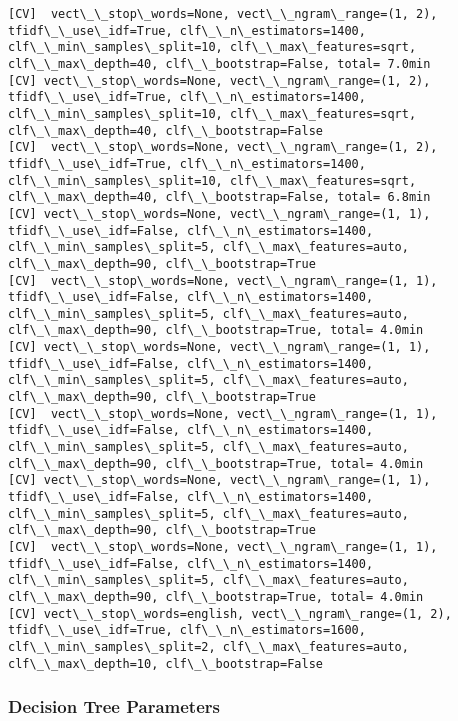 \documentclass[11pt]{article}
\begin{document}
\begin{Verbatim}[commandchars=\\\{\}]
[CV]  vect\_\_stop\_words=None, vect\_\_ngram\_range=(1, 2), tfidf\_\_use\_idf=True, clf\_\_n\_estimators=1400, clf\_\_min\_samples\_split=10, clf\_\_max\_features=sqrt, clf\_\_max\_depth=40, clf\_\_bootstrap=False, total= 7.0min
[CV] vect\_\_stop\_words=None, vect\_\_ngram\_range=(1, 2), tfidf\_\_use\_idf=True, clf\_\_n\_estimators=1400, clf\_\_min\_samples\_split=10, clf\_\_max\_features=sqrt, clf\_\_max\_depth=40, clf\_\_bootstrap=False 
[CV]  vect\_\_stop\_words=None, vect\_\_ngram\_range=(1, 2), tfidf\_\_use\_idf=True, clf\_\_n\_estimators=1400, clf\_\_min\_samples\_split=10, clf\_\_max\_features=sqrt, clf\_\_max\_depth=40, clf\_\_bootstrap=False, total= 6.8min
[CV] vect\_\_stop\_words=None, vect\_\_ngram\_range=(1, 1), tfidf\_\_use\_idf=False, clf\_\_n\_estimators=1400, clf\_\_min\_samples\_split=5, clf\_\_max\_features=auto, clf\_\_max\_depth=90, clf\_\_bootstrap=True 
[CV]  vect\_\_stop\_words=None, vect\_\_ngram\_range=(1, 1), tfidf\_\_use\_idf=False, clf\_\_n\_estimators=1400, clf\_\_min\_samples\_split=5, clf\_\_max\_features=auto, clf\_\_max\_depth=90, clf\_\_bootstrap=True, total= 4.0min
[CV] vect\_\_stop\_words=None, vect\_\_ngram\_range=(1, 1), tfidf\_\_use\_idf=False, clf\_\_n\_estimators=1400, clf\_\_min\_samples\_split=5, clf\_\_max\_features=auto, clf\_\_max\_depth=90, clf\_\_bootstrap=True 
[CV]  vect\_\_stop\_words=None, vect\_\_ngram\_range=(1, 1), tfidf\_\_use\_idf=False, clf\_\_n\_estimators=1400, clf\_\_min\_samples\_split=5, clf\_\_max\_features=auto, clf\_\_max\_depth=90, clf\_\_bootstrap=True, total= 4.0min
[CV] vect\_\_stop\_words=None, vect\_\_ngram\_range=(1, 1), tfidf\_\_use\_idf=False, clf\_\_n\_estimators=1400, clf\_\_min\_samples\_split=5, clf\_\_max\_features=auto, clf\_\_max\_depth=90, clf\_\_bootstrap=True 
[CV]  vect\_\_stop\_words=None, vect\_\_ngram\_range=(1, 1), tfidf\_\_use\_idf=False, clf\_\_n\_estimators=1400, clf\_\_min\_samples\_split=5, clf\_\_max\_features=auto, clf\_\_max\_depth=90, clf\_\_bootstrap=True, total= 4.0min
[CV] vect\_\_stop\_words=english, vect\_\_ngram\_range=(1, 2), tfidf\_\_use\_idf=True, clf\_\_n\_estimators=1600, clf\_\_min\_samples\_split=2, clf\_\_max\_features=auto, clf\_\_max\_depth=10, clf\_\_bootstrap=False 

    \end{Verbatim}

    \subsubsection{Decision Tree Parameters}\label{decision-tree-parameters}
\end{document}
